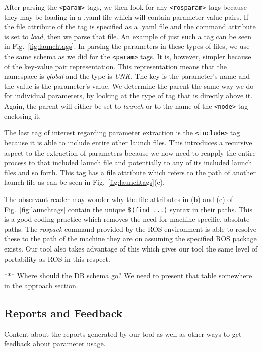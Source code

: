 After parsing the \texttt{<param>} tags, we then look for any \texttt{<rosparam>} tags because they may be loading in a .yaml file which will contain parameter-value pairs. If the file attribute of the tag is specified as a .yaml file and the command attribute is set to \emph{load}, then we parse that file. An example of just such a tag can be seen in Fig.~\ref{fig:launchtags}. In parsing the parameters in these types of files, we use the same schema as we did for the \texttt{<param>} tags. It is, however, simpler because of the key-value pair representation. This representation means that the namespace is \emph{global} and the type is \emph{UNK}. The key is the parameter's name and the value is the parameter's value. We determine the parent the same way we do for individual parameters, by looking at the type of tag that is directly above it. Again, the parent will either be set to \emph{launch} or to the name of the \texttt{<node>} tag enclosing it.

The last tag of interest regarding parameter extraction is the \texttt{<include>} tag because it is able to include entire other launch files. This introduces a recursive aspect to the extraction of parameters because we now need to reapply the entire process to that included launch file and potentially to any of its included launch files and so forth. This tag has a file attribute which refers to the path of another launch file as can be seen in Fig.~\ref{fig:launchtags}(c).

The observant reader may wonder why the file attributes in (b) and (c) of Fig.~\ref{fig:launchtags} contain the unique \texttt{$\$$(find ...)} syntax in their paths. This is a good coding practice which removes the need for machine-specific, absolute paths. The \emph{rospack} command provided by the ROS environment is able to resolve these to the path of the machine they are on assuming the specified ROS package exists. Our tool also takes advantage of this which gives our tool the same level of portability as ROS in this respect.

*** Where should the DB schema go? We need to present that table somewhere in the approach section.


%



%



\subsection{Reports and Feedback}

Content about the reports generated by our tool as well as other ways to get feedback about parameter usage.
